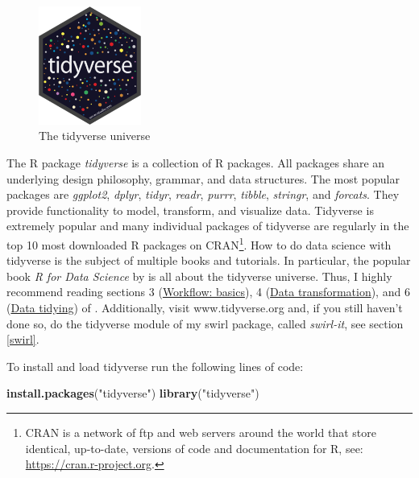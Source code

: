 \documentclass[
  12pt,
  oneside]{book}
\newenvironment{Shaded}{\begin{snugshade}}{\end{snugshade}}
\newcommand{\FunctionTok}[1]{\textcolor[rgb]{0.13,0.29,0.53}{\textbf{#1}}}
\newcommand{\NormalTok}[1]{#1}
\newcommand{\StringTok}[1]{\textcolor[rgb]{0.31,0.60,0.02}{#1}}
\begin{document}
\begin{figure}
\centering
\includegraphics[width=0.3\textwidth,height=\textheight]{fig/tidyverse-logo.png}
\caption{\label{fig:tidyverse-logo} The tidyverse universe}
\end{figure}

The R package \emph{tidyverse} is a collection of R packages. All packages share an underlying design philosophy, grammar, and data structures.
The most popular packages are \emph{ggplot2}, \emph{dplyr}, \emph{tidyr}, \emph{readr}, \emph{purrr}, \emph{tibble}, \emph{stringr}, and \emph{forcats}. They provide functionality to model, transform, and visualize data. Tidyverse is extremely popular and many individual packages of tidyverse are regularly in the top 10 most downloaded R packages on CRAN\footnote{CRAN is a network of ftp and web servers around the world that store identical, up-to-date, versions of code and documentation for R, see: \url{https://cran.r-project.org}.}. How to do data science with tidyverse is the subject of multiple books and tutorials. In particular, the popular book \emph{R for Data Science} by \citet{Wickham2023R} is all about the tidyverse universe. Thus, I highly recommend reading sections 3 (\href{https://r4ds.hadley.nz/workflow-basics.html}{Workflow: basics}), 4 (\href{https://r4ds.hadley.nz/data-transform.html}{Data transformation}), and 6 (\href{https://r4ds.hadley.nz/data-tidy}{Data tidying}) of \citet{Wickham2023R}. Additionally, visit www.tidyverse.org and, if you still haven't done so, do the tidyverse module of my swirl package, called \emph{swirl-it}, see section \ref{swirl}.

To install and load tidyverse run the following lines of code:

\begin{Shaded}
\begin{Highlighting}[]
\FunctionTok{install.packages}\NormalTok{(}\StringTok{"tidyverse"}\NormalTok{)}
\FunctionTok{library}\NormalTok{(}\StringTok{"tidyverse"}\NormalTok{)}
\end{Highlighting}
\end{Shaded}
\end{document}

